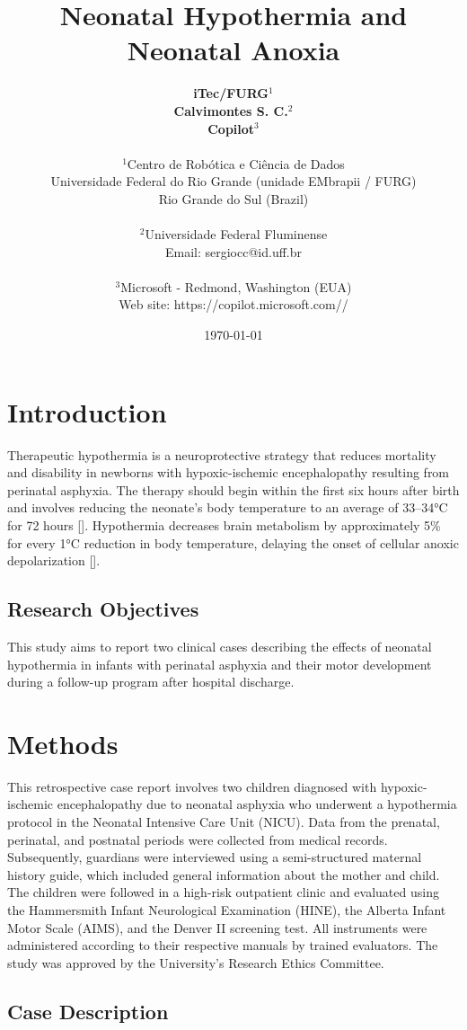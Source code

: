 \documentclass[11pt,a4paper]{article}
\title{\textbf{Neonatal Hypothermia and Neonatal Anoxia}}
\author{
	\textbf{iTec/FURG}$^{1}$ \\
	\textbf{Calvimontes S. C.}$^{2}$ \\
	\textbf{Copilot}$^{3}$ \\
	\\
	\small $^{1}$Centro de Robótica e Ciência de Dados \\
	\small Universidade Federal do Rio Grande (unidade EMbrapii / FURG) \\
	\small Rio Grande do Sul (Brazil) \\
	\\
	\small $^{2}$Universidade Federal Fluminense \\
	\small Email: sergiocc@id.uff.br \\
	\\
	\small $^{3}$Microsoft - Redmond, Washington (EUA) \\
	\small Web site: https://copilot.microsoft.com//
}
\date{\today}
\begin{document}
	
	\maketitle
	
	\newpage
	
	\section{Introduction}
	
	Therapeutic hypothermia is a neuroprotective strategy that reduces mortality and disability in newborns with hypoxic-ischemic encephalopathy resulting from perinatal asphyxia. The therapy should begin within the first six hours after birth and involves reducing the neonate’s body temperature to an average of 33–34°C for 72 hours [\cite{Azzopardi2014,Thayyil2021,Abate2021}]. Hypothermia decreases brain metabolism by approximately 5\% for every 1°C reduction in body temperature, delaying the onset of cellular anoxic depolarization [\cite{Silveira2015}].
		
	\subsection{Research Objectives}
	This study aims to report two clinical cases describing the effects of neonatal hypothermia in infants with perinatal asphyxia and their motor development during a follow-up program after hospital discharge.
	
	\section{Methods}
	This retrospective case report involves two children diagnosed with hypoxic-ischemic encephalopathy due to neonatal asphyxia who underwent a hypothermia protocol in the Neonatal Intensive Care Unit (NICU). Data from the prenatal, perinatal, and postnatal periods were collected from medical records. Subsequently, guardians were interviewed using a semi-structured maternal history guide, which included general information about the mother and child. The children were followed in a high-risk outpatient clinic and evaluated using the Hammersmith Infant Neurological Examination (HINE), the Alberta Infant Motor Scale (AIMS), and the Denver II screening test. All instruments were administered according to their respective manuals by trained evaluators. The study was approved by the University's Research Ethics Committee.
	
	\subsection{Case Description}
\end{document}
